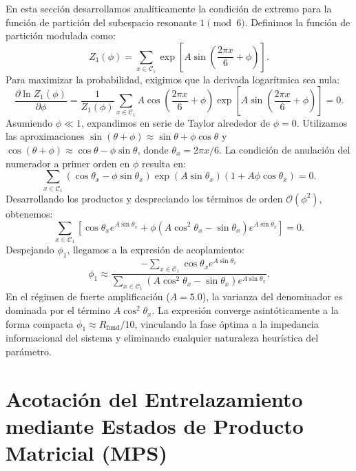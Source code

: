 \documentclass[12pt,a4paper]{article}
\theoremstyle{plain}
\theoremstyle{definition}
\theoremstyle{remark}
\begin{document}
En esta sección desarrollamos analíticamente la condición de extremo para la función de partición del subespacio resonante $1 \pmod 6$. Definimos la función de partición modulada como:
\begin{equation}
Z_1(\phi) = \sum_{x \in \mathcal{C}_1} \exp\left[A \sin\left(\frac{2\pi x}{6} + \phi\right)\right].
\end{equation}
Para maximizar la probabilidad, exigimos que la derivada logarítmica sea nula:
\begin{equation}
\frac{\partial \ln Z_1(\phi)}{\partial \phi} = \frac{1}{Z_1(\phi)} \sum_{x \in \mathcal{C}_1} A \cos\left(\frac{2\pi x}{6} + \phi\right) \exp\left[A \sin\left(\frac{2\pi x}{6} + \phi\right)\right] = 0.
\end{equation}
Asumiendo $\phi \ll 1$, expandimos en serie de Taylor alrededor de $\phi = 0$. Utilizamos las aproximaciones $\sin(\theta + \phi) \approx \sin\theta + \phi\cos\theta$ y $\cos(\theta + \phi) \approx \cos\theta - \phi\sin\theta$, donde $\theta_x = 2\pi x/6$. 
La condición de anulación del numerador a primer orden en $\phi$ resulta en:
\begin{equation}
\sum_{x \in \mathcal{C}_1} \left( \cos\theta_x - \phi\sin\theta_x \right) \exp(A\sin\theta_x) \left( 1 + A\phi\cos\theta_x \right) = 0.
\end{equation}
Desarrollando los productos y despreciando los términos de orden $\mathcal{O}(\phi^2)$, obtenemos:
\begin{equation}
\sum_{x \in \mathcal{C}_1} \left[ \cos\theta_x e^{A\sin\theta_x} + \phi \left( A\cos^2\theta_x - \sin\theta_x \right) e^{A\sin\theta_x} \right] = 0.
\end{equation}
Despejando $\phi_1$, llegamos a la expresión de acoplamiento:
\begin{equation}
\phi_1 \approx \frac{- \sum_{x \in \mathcal{C}_1} \cos\theta_x e^{A\sin\theta_x}}{\sum_{x \in \mathcal{C}_1} \left( A\cos^2\theta_x - \sin\theta_x \right) e^{A\sin\theta_x}}.
\end{equation}
En el régimen de fuerte amplificación ($A = 5.0$), la varianza del denominador es dominada por el término $A\cos^2\theta_x$. La expresión converge asintóticamente a la forma compacta $\phi_1 \approx R_{\text{fund}}/10$, vinculando la fase óptima a la impedancia informacional del sistema y eliminando cualquier naturaleza heurística del parámetro.

\section{Acotación del Entrelazamiento mediante Estados de Producto Matricial (MPS)}
\label{app:mps}
\end{document}
